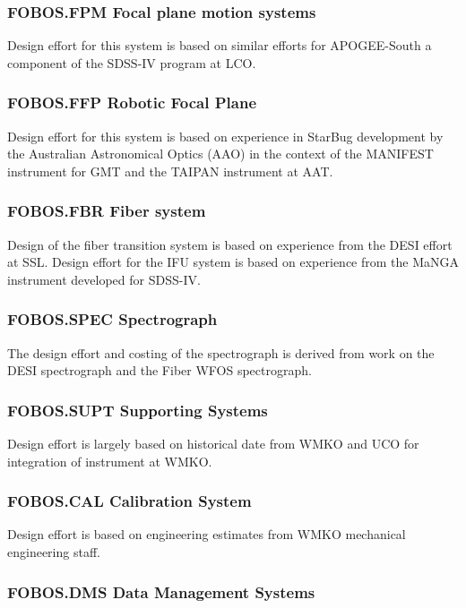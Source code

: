 \documentclass[oneside,11pt]{amsart}
\begin{document}
\subsubsection{FOBOS.FPM Focal plane motion systems}

Design effort for this system is based on similar efforts for
APOGEE-South a component of the SDSS-IV program at LCO.

\subsubsection{FOBOS.FFP Robotic Focal Plane}

Design effort for this system is based on experience in StarBug
development by the Australian Astronomical Optics (AAO) in the
context of the MANIFEST instrument for GMT and the TAIPAN instrument
at AAT.

\subsubsection{FOBOS.FBR Fiber system}

Design of the fiber transition system is based on experience from the
DESI effort at SSL. Design effort for the IFU system is based on
experience from the MaNGA instrument developed for SDSS-IV.

\subsubsection{FOBOS.SPEC Spectrograph}

The design effort and costing of the spectrograph is derived from
work on the DESI spectrograph and the Fiber WFOS spectrograph.

\subsubsection{FOBOS.SUPT Supporting Systems}

Design effort is largely based on historical date from WMKO and UCO
for integration of instrument at WMKO.

\subsubsection{FOBOS.CAL Calibration System}

Design effort is based on engineering estimates from WMKO mechanical
engineering staff.

\subsubsection{FOBOS.DMS Data Management Systems}
\end{document}
